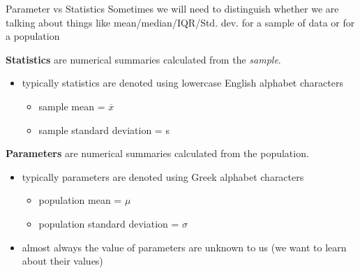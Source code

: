 \documentclass{beamer}
\begin{document}
\begin{frame}{Parameter vs Statistics}
Sometimes we will need to distinguish whether we are talking about things like mean/median/IQR/Std. dev. for a sample of data or for a population\vspace{4mm}

\textbf{Statistics} are numerical summaries calculated from the \textit{sample}.
\begin{itemize}
    \item typically statistics are denoted using lowercase English alphabet characters
        \begin{itemize}
            \item sample mean = $\overline{x}$
            \item sample standard deviation = s
        \end{itemize}
\end{itemize} \vspace{3mm}

\textbf{Parameters} are numerical summaries calculated from the population.
\begin{itemize}
    \item typically parameters are denoted using Greek alphabet characters
        \begin{itemize}
            \item population mean = $\mu$
            \item population standard deviation = $\sigma$
        \end{itemize}
    \item almost always the value of parameters are unknown to us (we want to learn about their values)
\end{itemize}
\end{frame}
\end{document}
